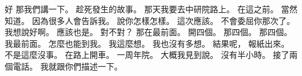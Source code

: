 \hypertarget{c01:cue:3123}{}好 那我們講一下。
\hypertarget{c01:cue:3124}{}趁死發生的故事。
\hypertarget{c01:cue:3125}{}那天我要去中研院路上。
\hypertarget{c01:cue:3126}{}在這之前。
\hypertarget{c01:cue:3127}{}當然知道。
\hypertarget{c01:cue:3128}{}因為很多人會告訴我。
\hypertarget{c01:cue:3129}{}說你怎樣怎樣。
\hypertarget{c01:cue:3130}{}這次應該。
\hypertarget{c01:cue:3131}{}不會委屈你那次了。
\hypertarget{c01:cue:3132}{}我想說好啊。
\hypertarget{c01:cue:3133}{}應該也是。
\hypertarget{c01:cue:3134}{}對不對？
\hypertarget{c01:cue:3135}{}那在最前面。
\hypertarget{c01:cue:3136}{}開四個。
\hypertarget{c01:cue:3137}{}那四個。
\hypertarget{c01:cue:3138}{}那四個。
\hypertarget{c01:cue:3139}{}我最前面。
\hypertarget{c01:cue:3140}{}怎麼也能到我。
\hypertarget{c01:cue:3141}{}我這麼想。
\hypertarget{c01:cue:3142}{}我也沒有多想。
\hypertarget{c01:cue:3143}{}結果呢，
\hypertarget{c01:cue:3144}{}報紙出來。
\hypertarget{c01:cue:3145}{}不是這麼沒事。
\hypertarget{c01:cue:3146}{}在路上開車。
\hypertarget{c01:cue:3147}{}一周年院。
\hypertarget{c01:cue:3148}{}大概我見到說。
\hypertarget{c01:cue:3149}{}沒有半小時。
\hypertarget{c01:cue:3150}{}接了兩個電話。
\hypertarget{c01:cue:3151}{}我就跟你們描述一下。

